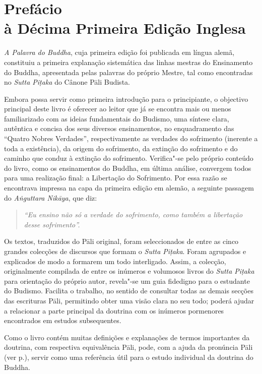 \chapter[Prefácio à Décima Primeira Edição Inglesa]{Prefácio\\ à Décima Primeira Edição Inglesa}

\emph{A Palavra do Buddha}, cuja primeira edição foi publicada em língua alemã,
constituiu a primeira explanação sistemática das linhas mestras do Ensinamento
do Buddha, apresentada pelas palavras do próprio Mestre, tal como encontradas no
\emph{Sutta Piṭaka} do Cânone Pāli Budista.

Embora possa servir como primeira introdução para o principiante, o objectivo
principal deste livro é oferecer ao leitor que já se encontra mais ou menos
familiarizado com as ideias fundamentais do Budismo, uma síntese clara,
autêntica e concisa dos seus diversos ensinamentos, no enquadramento das
``Quatro Nobres Verdades'', respectivamente as verdades do sofrimento (inerente
a toda a existência), da origem do sofrimento, da extinção do sofrimento e do
caminho que conduz à extinção do sofrimento. Verifica"-se pelo próprio conteúdo
do livro, como os ensinamentos do Buddha, em última análise, convergem todos
para uma realização final: a Libertação do Sofrimento. Por essa razão se
encontrava impressa na capa da primeira edição em alemão, a seguinte passagem do
\emph{Aṅguttara Nikāya}, que diz:

\begin{verse}
  \emph{``Eu ensino não só a verdade do sofrimento, como também a libertação
    desse sofrimento''.}
\end{verse}

Os textos, traduzidos do Pāli original, foram seleccionados de entre as cinco
grandes colecções de discursos que formam o \emph{Sutta Piṭaka}. Foram agrupados
e explicados de modo a formarem um todo interligado. Assim, a colecção,
originalmente compilada de entre os inúmeros e volumosos livros do \emph{Sutta
  Piṭaka} para orientação do próprio autor, revela"-se um guia fidedigno para o
estudante do Budismo. Facilita o trabalho, no sentido de consultar todas as
demais secções das escrituras Pāli, permitindo obter uma visão clara no seu
todo; poderá ajudar a relacionar a parte principal da doutrina com os inúmeros
pormenores encontrados em estudos subsequentes.

Como o livro contém muitas definições e explanações de termos importantes da
doutrina, com respectiva equivalência Pāli, pode, com a ajuda da pronúncia Pāli
(ver p.\pageref{pron-pali}), servir como uma referência útil para o estudo individual
da doutrina do Buddha.

